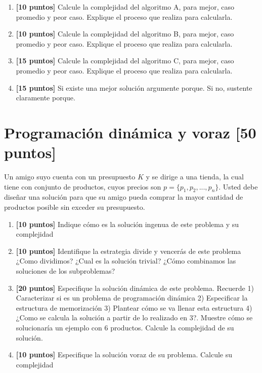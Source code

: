 \documentclass[9pt,twocolumn]{article}
\begin{document}
\begin{enumerate}
	\item \textbf{[10 puntos]} Calcule la complejidad del algoritmo A, para mejor, caso promedio y peor caso. Explique el proceso que realiza para calcularla.
	\item \textbf{[10 puntos]} Calcule la complejidad del algoritmo B, para mejor, caso promedio y peor caso. Explique el proceso que realiza para calcularla.
	\item \textbf{[15 puntos]} Calcule la complejidad del algoritmo C, para mejor, caso promedio y peor caso. Explique el proceso que realiza para calcularla.

	\item \textbf{[15 puntos]} Si existe una mejor solución argumente porque. Si no, sustente claramente porque.
\end{enumerate}

\section{Programación dinámica y voraz \small{[50 puntos]}} 

Un amigo suyo cuenta con un presupuesto $K$ y se dirige a una tienda, la cual tiene con conjunto de productos, cuyos precios son $p=\{p_1,p_2,...,p_n\}$. Usted debe diseñar una solución para que su amigo pueda comprar la mayor cantidad de productos posible sin exceder su presupuesto.

\begin{enumerate}
	\item \textbf{[10 puntos]} Indique cómo es la solución ingenua de este problema y su complejidad 
	\item \textbf{[10 puntos]} Identifique la estrategia divide y vencerás de este problema ¿Como dividimos? ¿Cual es la solución trivial? ¿Cómo combinamos las soluciones de los subproblemas?
	\item \textbf{[20 puntos]} Especifique la solución dinámica de este problema. Recuerde 1) Caracterizar si es un problema de programación dinámica 2) Especificar la estructura de memorización 3) Plantear cómo se va llenar esta estructura 4) ¿Como se calcula la solución a partir de lo realizado en 3?. Muestre cómo se solucionaría un ejemplo con 6 productos. Calcule la complejidad de su solución.
	\item \textbf{[10 puntos]} Especifique la solución voraz de su problema. Calcule su complejidad
\end{enumerate}
\end{document}
